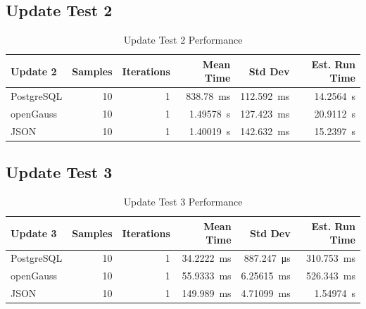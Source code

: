\documentclass[14pt,a4paper]{article}
\begin{document}
    \subsection{Update Test 2}
    
    \begin{table}[H]
        \centering        
        \begin{tabular}{lrrrrr}
            \toprule
            \textbf{Update 2} & \textbf{Samples} & \textbf{Iterations} & \textbf{Mean Time} & \textbf{Std Dev} & \textbf{Est. Run Time} \\
            \midrule
            PostgreSQL & 10 & 1 & \qty{838.78}{\milli\second} & \qty{112.592}{\milli\second} & \qty{14.2564}{\second} \\
            openGauss & 10 & 1 & \qty{1.49578}{\second} & \qty{127.423}{\milli\second} & \qty{20.9112}{\second} \\
            JSON & 10 & 1 & \qty{1.40019}{\second} & \qty{142.632}{\milli\second} & \qty{15.2397}{\second} \\
            \bottomrule
        \end{tabular}
        \caption{Update Test 2 Performance}
    \end{table}
    
    \subsection{Update Test 3}
    
    \begin{table}[H]
        \centering        
        \begin{tabular}{lrrrrr}
            \toprule
            \textbf{Update 3} & \textbf{Samples} & \textbf{Iterations} & \textbf{Mean Time} & \textbf{Std Dev} & \textbf{Est. Run Time} \\
            \midrule
            PostgreSQL & 10 & 1 & \qty{34.2222}{\milli\second} & \qty{887.247}{\micro\second} & \qty{310.753}{\milli\second} \\
            openGauss & 10 & 1 & \qty{55.9333}{\milli\second} & \qty{6.25615}{\milli\second} & \qty{526.343}{\milli\second} \\
            JSON & 10 & 1 & \qty{149.989}{\milli\second} & \qty{4.71099}{\milli\second} & \qty{1.54974}{\second} \\
            \bottomrule
        \end{tabular}
        \caption{Update Test 3 Performance}
    \end{table}
    
\end{document}
